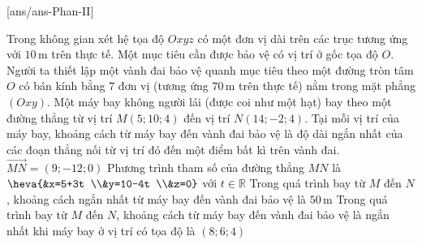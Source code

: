 \cauds
{}[ans/ans\currfilebase-Phan-II]
\begin{ex}%
	Trong không gian xét hệ tọa độ $Oxyz$ có một đơn vị dài trên các trục tương ứng với $10$\,m trên thực tế. Một mục tiêu cần được bảo vệ có vị trí ở gốc tọa độ $O$. Người ta thiết lập một vành đai bảo vệ quanh mục tiêu theo một đường tròn tâm $O$ có bán kính bằng $7$ đơn vị (tương ứng $70$\,m trên thực tế) nằm trong mặt phẳng $(Oxy)$. Một máy bay không người lái (được coi như một hạt) bay theo một đường thẳng từ vị trí $M(5;10;4)$ đến vị trí $N(14;-2;4)$. Tại mỗi vị trí của máy bay, khoảng cách từ máy bay đến vành đai bảo vệ là độ dài ngắn nhất của các đoạn thẳng nối từ vị trí đó đến một điểm bất kì trên vành đai.
	\choiceTF
		{\True $\overrightarrow{MN}=(9;-12;0)$}
		{Phương trình tham số của đường thẳng $MN$ là $\heva{&x=5+3t \\&y=10-4t \\&z=0}$ với $t \in \mathbb{R}$}
		{\True Trong quá trình bay từ $M$ đến $N$, khoảng cách ngắn nhất từ máy bay đến vành đai bảo vệ là $50$\,m}
		{\True Trong quá trình bay từ $M$ đến $N$, khoảng cách từ máy bay đến vành đai bảo vệ là ngắn nhất khi máy bay ở vị trí có tọa độ là $(8;6;4)$}
\end{ex}
